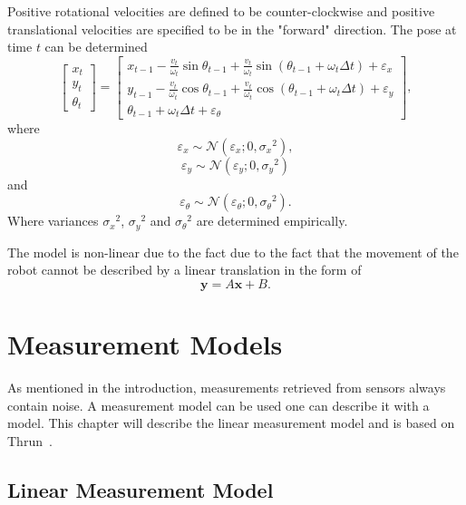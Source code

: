 \documentclass[12pt,oneside,openany,a4paper, %
afrikaans,english,
]{memoir}
\numberwithin{equation}{chapter}
\begin{document}
Positive rotational velocities are defined to be counter-clockwise and positive translational velocities are specified to be in the "forward" direction.
The pose at time $t$ can be determined
\begin{equation}
\begin{bmatrix}
x_t\\
y_t\\
\theta_t
\end{bmatrix}
=
\begin{bmatrix}
x_{t-1} - \frac{v_t}{\omega_t} \sin\theta_{t-1} + \frac{v_t}{\omega_t} \sin(\theta_{t-1} + \omega_t \Delta t) + \varepsilon_x\\
y_{t-1} - \frac{v_t}{\omega_t} \cos\theta_{t-1} + \frac{v_t}{\omega_t} \cos(\theta_{t-1} + \omega_t \Delta t) + \varepsilon_y\\
\theta_{t-1} + \omega_t \Delta t + \varepsilon_\theta
\end{bmatrix},
\end{equation}
where
\begin{equation}
\varepsilon_x \sim \mathcal{N}(\varepsilon_x; 0, {\sigma_x}^2),
\end{equation}
\begin{equation}
\varepsilon_y \sim \mathcal{N}(\varepsilon_y; 0, {\sigma_y}^2)
\end{equation}
and
\begin{equation}
\varepsilon_\theta \sim \mathcal{N}(\varepsilon_\theta; 0, {\sigma_\theta}^2).
\end{equation}
Where variances ${\sigma_x}^2$, ${\sigma_y}^2$ and ${\sigma_\theta}^2$ are determined empirically.

The model is non-linear due to the fact due to the fact that the movement of the robot cannot be described by a linear translation in the form of
\begin{equation}
\bm{y} = A\bm{x} + B.
\end{equation}
\chapter{Measurement Models}

As mentioned in the introduction, measurements retrieved from sensors always contain noise. A measurement model can be used one can describe it with a model. This chapter will describe the linear measurement model and is based on Thrun~\citep{thrun}.
\section{Linear Measurement Model}
\end{document}
